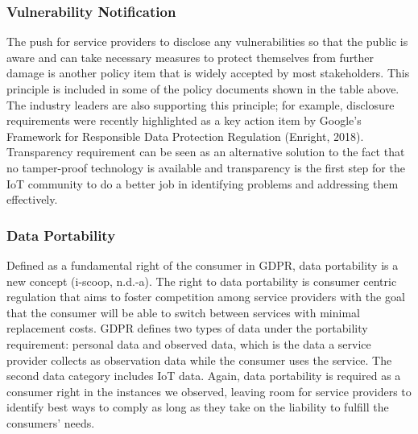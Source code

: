\subsubsection{Vulnerability Notification}
The push for service providers to disclose any vulnerabilities so that the public is aware and can take necessary measures to protect themselves from further damage is another policy item that is widely accepted by most stakeholders. This principle is included in some of the policy documents shown in the table above. The industry leaders are also supporting this principle; for example, disclosure requirements were recently highlighted as a key action item by Google’s Framework for Responsible Data Protection Regulation (Enright, 2018). Transparency requirement can be seen as an alternative solution to the fact that no tamper-proof technology is available and transparency is the first step for the IoT community to do a better job in identifying problems and addressing them effectively. 

\subsubsection{Data Portability}
Defined as a fundamental right of the consumer in GDPR, data portability is a new concept (i-scoop, n.d.-a). The right to data portability is consumer centric regulation that aims to foster competition among service providers with the goal that the consumer will be able to switch between services with minimal replacement costs. GDPR defines two types of data under the portability requirement: personal data and observed data, which is the data a service provider collects as observation data while the consumer uses the service. The second data category includes IoT data. Again, data portability is required as a consumer right in the instances we observed, leaving room for service providers to identify best ways to comply as long as they take on the liability to fulfill the consumers’ needs.
